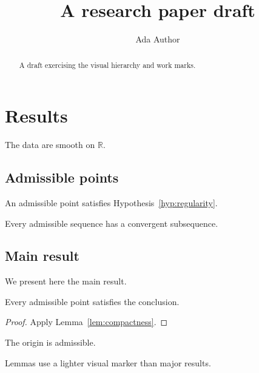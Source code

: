 \documentclass[11pt]{ocots-paper}
\title[Draft example]{A research paper draft}
\author{Ada Author}
\newcommand{\R}{\mathbb{R}}
\begin{document}
\begin{abstract}
A draft exercising the visual hierarchy and work marks.
\end{abstract}
\maketitle

\section{Results}


\begin{hypothesis}[Regularity]
\label{hyp:regularity}
The data are smooth on $\R$.
\end{hypothesis}

\subsection{Admissible points}

\begin{definition}
An admissible point satisfies Hypothesis~\ref{hyp:regularity}.
\end{definition}

\begin{lemma}[Compactness]
\label{lem:compactness}
Every admissible sequence has a convergent subsequence.
\end{lemma}

\subsection{Main result}

We present here the main result.

\begin{theorem}
Every admissible point satisfies the conclusion.
\end{theorem}

\begin{proof}
Apply Lemma~\ref{lem:compactness}.
\end{proof}

\begin{example}
The origin is admissible.
\end{example}

\begin{remark}
Lemmas use a lighter visual marker than major results.
\end{remark}
\end{document}
